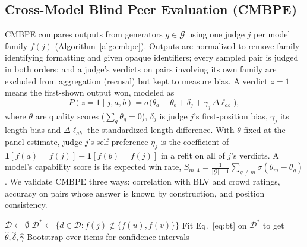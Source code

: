 \documentclass[10pt,conference]{IEEEtran}
\begin{document}
\subsection{Cross-Model Blind Peer Evaluation (CMBPE)}
CMBPE compares outputs from generators $g\in\mathcal{G}$ using one judge $j$ per model family $f(j)$ (Algorithm~\ref{alg:cmbpe}). Outputs are normalized to remove family-identifying formatting and given opaque identifiers; every sampled pair is judged in both orders; and a judge's verdicts on pairs involving its own family are excluded from aggregation (recusal) but kept to measure bias. A verdict $z=1$ means the first-shown output won, modeled as
\begin{equation}
P(z=1\mid j,a,b)=\sigma\big(\theta_a-\theta_b+\delta_j+\gamma_j\,\Delta\ell_{ab}\big),\label{eq:bt}
\end{equation}
where $\theta$ are quality scores ($\sum_g\theta_g=0$), $\delta_j$ is judge $j$'s first-position bias, $\gamma_j$ its length bias and $\Delta\ell_{ab}$ the standardized length difference. With $\theta$ fixed at the panel estimate, judge $j$'s self-preference $\eta_j$ is the coefficient of $\mathbf{1}[f(a)=f(j)]-\mathbf{1}[f(b)=f(j)]$ in a refit on all of $j$'s verdicts. A model's capability score is its expected win rate, $S_{m,4}=\frac{1}{|\mathcal{G}|-1}\sum_{g\neq m}\sigma(\theta_m-\theta_g)$. We validate CMBPE three ways: correlation with BLV and crowd ratings, accuracy on pairs whose answer is known by construction, and position consistency.

\begin{algorithm}[t]
\caption{Cross-Model Blind Peer Evaluation}\label{alg:cmbpe}
\small
{}
$\mathcal{D}\leftarrow\emptyset$\;
$\mathcal{D}^{\ast}\leftarrow\{d\in\mathcal{D}: f(j)\notin\{f(u),f(v)\}\}$
Fit Eq.~\eqref{eq:bt} on $\mathcal{D}^{\ast}$ to get $\hat\theta,\hat\delta,\hat\gamma$\;
Bootstrap over items for confidence intervals\;
\end{algorithm}
\end{document}
